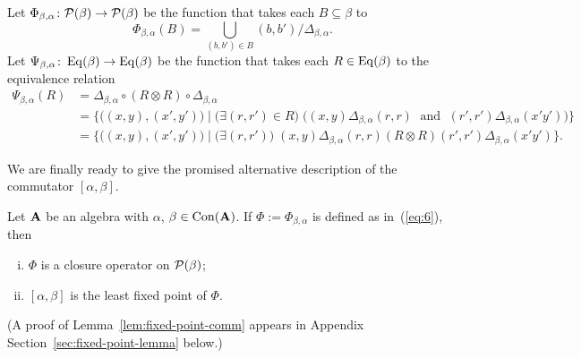 Let $\Phi_{\beta, \alpha} \colon \mathcal{P}(\beta) \to \mathcal{P}(\beta)$ be the function that
takes each $B \subseteq \beta$ to
\begin{equation}
  \label{eq:6}
  \Phi_{\beta, \alpha}(B) = \bigcup_{(b,b')\in B} (b,b')/\Delta_{\beta, \alpha}.
\end{equation}
Let $\Psi_{\beta, \alpha} \colon \operatorname{Eq}(\beta) \to \operatorname{Eq}(\beta)$ be the function that
takes each $R \in \operatorname{Eq}(\beta)$ to the equivalence relation
\begin{align*}
  \Psi_{\beta, \alpha}(R) &= \Delta_{\beta, \alpha} \circ (R \otimes R) \circ \Delta_{\beta, \alpha} \\
  &= \{\bigl((x,y), (x',y')\bigr) \mid \bigl(\exists (r, r') \in R\bigr) \;
  \bigl((x,y) \mathrel{\Delta_{\beta, \alpha}} (r,r) \; \text{ and } \;  (r',r')
  \mathrel{\Delta_{\beta, \alpha}} (x'y')\bigr)\}\\
  &= \{\bigl((x,y), (x',y')\bigr) \mid \bigl(\exists (r, r')\bigr) \;
  (x,y) \mathrel{\Delta_{\beta, \alpha}} (r,r) \mathrel{(R \otimes R)} (r',r')
  \mathrel{\Delta_{\beta, \alpha}} (x'y')\}.
\end{align*}
\newcommand{\Phiba}{\ensuremath{\Phi}}
\newcommand{\Psiba}{\ensuremath{\Psi}}

We are finally ready to give the promised alternative description of the
commutator $[\alpha, \beta]$. 
\begin{lemma}
  \label{lem:fixed-point-comm}
  Let $\mathbf{A}$ be an algebra with $\alpha$, $\beta\in \operatorname{Con}(\mathbf{A})$.
  If $\Phi:=\Phi_{\beta, \alpha}$ is defined as in~(\ref{eq:6}), then 
  \begin{enumerate}[(i)]
  \item \label{item:111} $\Phiba$ is a closure operator on $\mathcal{P}(\beta)$;
  \item \label{item:222} $[\alpha, \beta]$ is the least fixed point of $\Phiba$.
  \end{enumerate}
\end{lemma}
\noindent (A proof of Lemma~\ref{lem:fixed-point-comm} appears in Appendix
Section~\ref{sec:fixed-point-lemma} below.)


